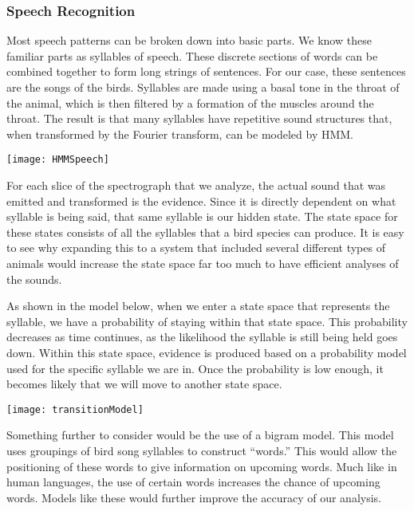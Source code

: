 \subsubsection{Speech Recognition}
Most speech patterns can be broken down into basic parts. We know these familiar parts as syllables of speech. These discrete sections of words can be combined together to form long strings of sentences. For our case, these sentences are the songs of the birds. Syllables are made using a basal tone in the throat of the animal, which is then filtered by a formation of the muscles around the throat. The result is that many syllables have repetitive sound structures that, when transformed by the Fourier transform, can be modeled by HMM.\par

\begin{center}
  \texttt{[image: HMMSpeech]}
\end{center}

For each slice of the spectrograph that we analyze, the actual sound that was emitted and transformed is the evidence. Since it is directly dependent on what syllable is being said, that same syllable is our hidden state. The state space for these states consists of all the syllables that a bird species can produce. It is easy to see why expanding this to a system that included several different types of animals would increase the state space far too much to have efficient analyses of the sounds.\par
As shown in the model below, when we enter a state space that represents the syllable, we have a probability of staying within that state space. This probability decreases as time continues, as the likelihood the syllable is still being held goes down. Within this state space, evidence is produced based on a probability model used for the specific syllable we are in. Once the probability is low enough, it becomes likely that we will move to another state space.\par

\begin{center}
  \texttt{[image: transitionModel]}
\end{center}

Something further to consider would be the use of a bigram model. This model uses groupings of bird song syllables to construct ``words.'' This would allow the positioning of these words to give information on upcoming words. Much like in human languages, the use of certain words increases the chance of upcoming words. Models like these would further improve the accuracy of our analysis.
\cite{berkeley}
